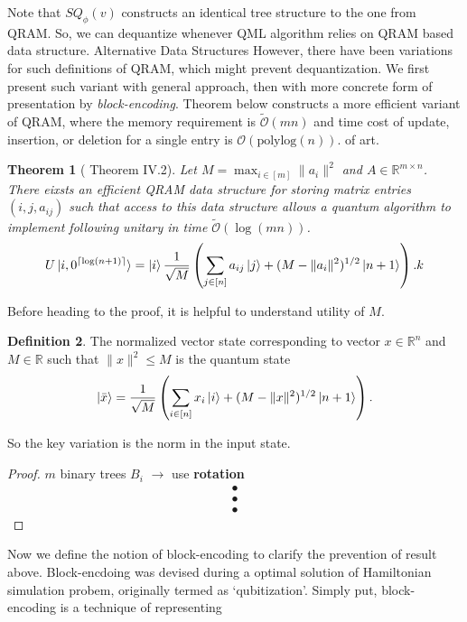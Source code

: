 \documentclass[10pt,twoside,reqno]{amsart} %
\makeatletter
\renewcommand{\section}{\@startsection{section}{1}
   \z@{.7\linespacing\@plus\linespacing}{.5\linespacing}
   {\normalfont\upshape\bfseries\centering}}
\theoremstyle{plain}
\newtheorem{thm}{Theorem}[section]
\theoremstyle{definition}
\newtheorem{defn}[thm]{Definition}
\makeatother
\begin{document}
Note that $SQ_{\phi}(v)$ constructs an identical tree structure to the one
from QRAM. So, we can dequantize whenever QML algorithm relies on QRAM
based data structure. 
\section{Alternative Data Structures}
However, there have been variations for such definitions of QRAM, which might
prevent dequantization. We first present such variant with general approach,
then with more concrete form of presentation by \emph{block-encoding}.
Theorem below constructs a more efficient variant of QRAM, where the memory
requirement \cite{kerenidis2020} is $\widetilde{\mathcal{O}}(mn)$ and time cost
of update, insertion, or deletion for a single entry is
$\mathcal{O}(\textrm{polylog}(n))$.
of art. 
\begin{thm}[\cite{kerenidis2020} Theorem IV.2]
  Let $M=\max_{i\in[m]}\|a_i\|^2$ and $A\in\mathbb{R}^{m\times n}$. There
  eixsts an efficient QRAM data structure for storing matrix entries
  $(i,j,a_{ij})$ such that access to this data structure allows a quantum
  algorithm to implement following unitary in time 
  $\widetilde{\mathcal{O}}(\log (mn))$.
  \[
    U\ket{i,0^{\lceil\log(n+1)\rceil}} = \ket{i}\frac{1}{\sqrt{M}}
    \left(\sum_{j\in[n]}a_{ij}\ket{j}+(M-\|a_i\|^2)^{1/2}\ket{n+1}\right).k
  \]
\end{thm}
Before heading to the proof, it is helpful to understand utility of $M$.
\begin{defn}
  The normalized vector state corresponding to vector $x\in\mathbb{R}^n$ and
  $M\in\mathbb{R}$ such that $\|x\|^2\leq M$ is the quantum state
  \[
    \ket{\bar{x}} = \frac{1}{\sqrt{M}}
    \left(\sum_{i\in[n]}x_i\ket{i}+(M-\|x\|^2)^{1/2}\ket{n+1}\right).
  \]
\end{defn}
So the key variation is the norm in the input state.
\begin{proof}
  $m$ binary trees $B_i$ $\longrightarrow$ use {\bfseries rotation}
  \begin{align*}
    \bullet\\\bullet \\\bullet
  \end{align*}
\end{proof}
Now we define the notion of block-encoding to clarify the prevention
of result above. Block-encdoing was devised during a optimal
solution of Hamiltonian simulation probem, \cite{low2019} originally termed
as `qubitization'. Simply put, block-encoding is a technique of representing
\end{document}
